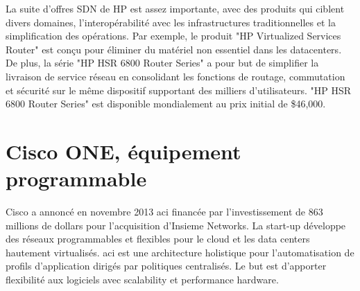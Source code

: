 
La suite d'offres SDN de HP est assez importante, avec des produits qui ciblent divers domaines, l'interopérabilité avec les infrastructures traditionnelles et la simplification des opérations. Par exemple, le produit "HP Virtualized Services Router" est conçu pour éliminer du matériel non essentiel dans les \glspl{datacenter}. De plus, la série "HP HSR 6800 Router Series" a pour but de simplifier la livraison de service réseau en consolidant les fonctions de routage, commutation et sécurité sur le même dispositif supportant des milliers d'utilisateurs. "HP HSR 6800 Router Series" est disponible mondialement au prix initial de \$46,000. \cite{ExecutiveGuideToSDNHPFabric}



\section{Cisco ONE, équipement programmable}





Cisco a annoncé en novembre 2013 \gls{aci} financée par l'investissement de 863 millions de dollars pour l'acquisition d'Insieme Networks. La start-up développe des réseaux programmables et flexibles pour le cloud et les data centers hautement virtualisés. \gls{aci} est une architecture holistique pour l'automatisation de profils d'application dirigés par politiques centralisés. Le but est d'apporter flexibilité aux logiciels avec \gls{scalability} et performance hardware. 


